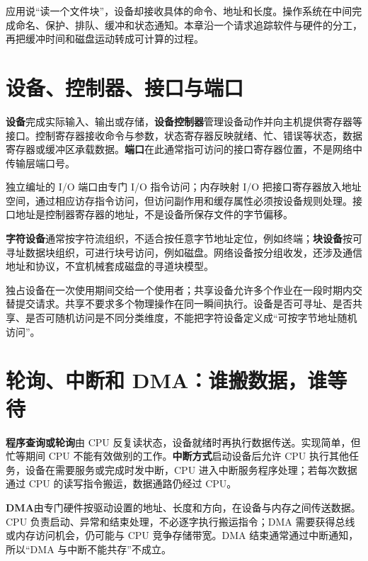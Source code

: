 应用说``读一个文件块''，设备却接收具体的命令、地址和长度。操作系统在中间完成命名、保护、排队、缓冲和状态通知。本章沿一个请求追踪软件与硬件的分工，再把缓冲时间和磁盘运动转成可计算的过程。

\section{设备、控制器、接口与端口}\label{os-7-1}

\textbf{设备}完成实际输入、输出或存储，\textbf{设备控制器}管理设备动作并向主机提供寄存器等接口。控制寄存器接收命令与参数，状态寄存器反映就绪、忙、错误等状态，数据寄存器或缓冲区承载数据。\textbf{端口}在此通常指可访问的接口寄存器位置，不是网络中传输层端口号。

独立编址的 I/O 端口由专门 I/O 指令访问；内存映射 I/O 把接口寄存器放入地址空间，通过相应访存指令访问，但访问副作用和缓存属性必须按设备规则处理。接口地址是控制器寄存器的地址，不是设备所保存文件的字节偏移。

\textbf{字符设备}通常按字符流组织，不适合按任意字节地址定位，例如终端；\textbf{块设备}按可寻址数据块组织，可进行块号访问，例如磁盘。网络设备按分组收发，还涉及通信地址和协议，不宜机械套成磁盘的寻道块模型。

独占设备在一次使用期间交给一个使用者；共享设备允许多个作业在一段时期内交替提交请求。共享不要求多个物理操作在同一瞬间执行。设备是否可寻址、是否共享、是否可随机访问是不同分类维度，不能把字符设备定义成``可按字节地址随机访问''。

\section{轮询、中断和 DMA：谁搬数据，谁等待}\label{os-7-2}

\textbf{程序查询或轮询}由 CPU 反复读状态，设备就绪时再执行数据传送。实现简单，但忙等期间 CPU 不能有效做别的工作。\textbf{中断方式}启动设备后允许 CPU 执行其他任务，设备在需要服务或完成时发中断，CPU 进入中断服务程序处理；若每次数据通过 CPU 的读写指令搬运，数据通路仍经过 CPU。

\textbf{DMA}由专门硬件按驱动设置的地址、长度和方向，在设备与内存之间传送数据。CPU 负责启动、异常和结束处理，不必逐字执行搬运指令；DMA 需要获得总线或内存访问机会，仍可能与 CPU 竞争存储带宽。DMA 结束通常通过中断通知，所以``DMA 与中断不能共存''不成立。

